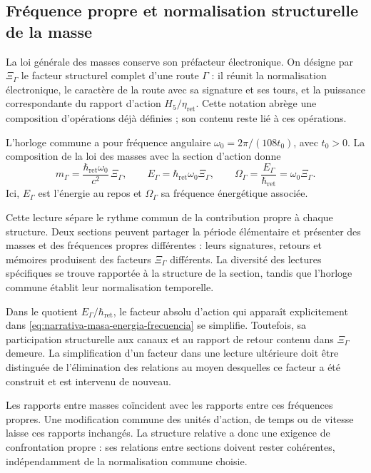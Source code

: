 \subsection{Fréquence propre et normalisation structurelle de la masse}
\label{subsec:narrativa-masa-frecuencia}

La loi générale des masses conserve son préfacteur électronique. On désigne par
$\Xi_\Gamma$ le facteur structurel complet d’une route $\Gamma$ : il réunit la
normalisation électronique, le caractère de la route avec sa signature et ses tours,
et la puissance correspondante du rapport d’action
$H_5/\eta_{\mathrm{ret}}$. Cette notation abrège une composition
d’opérations déjà définies ; son contenu reste lié à ces opérations.

L’horloge commune a pour fréquence angulaire
$\omega_0=2\pi/(108t_0)$, avec $t_0>0$. La composition de la loi des masses avec la section
d’action donne
\begin{equation}
 \boxed{
 m_\Gamma=\frac{\hbar_{\mathrm{ret}}\omega_0}{c^2}\,\Xi_\Gamma,
 \qquad
 E_\Gamma=\hbar_{\mathrm{ret}}\omega_0\Xi_\Gamma,
 \qquad
 \Omega_\Gamma=\frac{E_\Gamma}{\hbar_{\mathrm{ret}}}
             =\omega_0\Xi_\Gamma.}
 \label{eq:narrativa-masa-energia-frecuencia}
\end{equation}
Ici, $E_\Gamma$ est l’énergie au repos et $\Omega_\Gamma$ sa fréquence
énergétique associée.

Cette lecture sépare le rythme commun de la contribution propre à chaque
structure. Deux sections peuvent partager la période élémentaire et présenter
des masses et des fréquences propres différentes : leurs signatures, retours et mémoires
produisent des facteurs $\Xi_\Gamma$ différents. La diversité des lectures
spécifiques se trouve rapportée à la structure de la section, tandis que l’horloge
commune établit leur normalisation temporelle.

Dans le quotient $E_\Gamma/\hbar_{\mathrm{ret}}$, le facteur
absolu d’action qui apparaît explicitement dans
\eqref{eq:narrativa-masa-energia-frecuencia} se simplifie. Toutefois, sa
participation structurelle aux canaux et au rapport de retour contenu
dans $\Xi_\Gamma$ demeure. La simplification d’un facteur dans une lecture ultérieure
doit être distinguée de l’élimination des relations au moyen desquelles
ce facteur a été construit et est intervenu de nouveau.

Les rapports entre masses coïncident avec les rapports entre ces fréquences
propres. Une modification commune des unités d’action, de temps ou de vitesse
laisse ces rapports inchangés. La structure relative a donc
une exigence de confrontation propre : ses relations entre sections doivent
rester cohérentes, indépendamment de la normalisation commune choisie.

